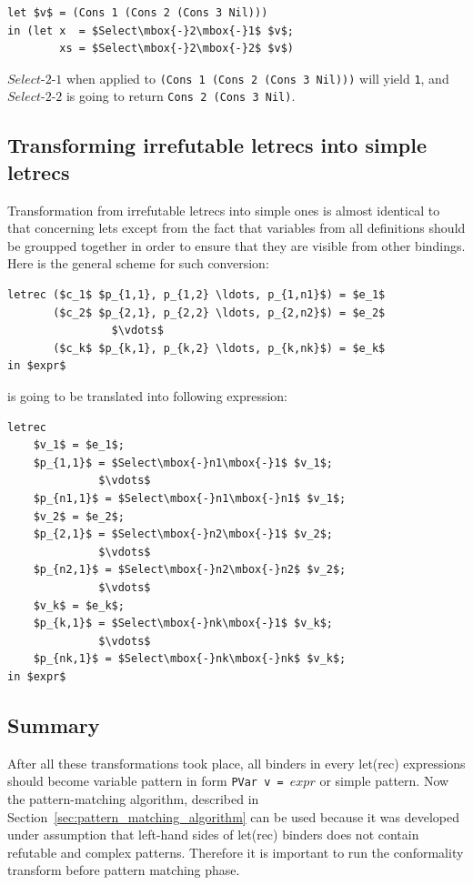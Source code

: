 \documentclass[12pt,a4paper]{report}
\begin{document}
\vspace*{0.2in}
\begin{lstlisting}[style=haskell,mathescape=true]
let $v$ = (Cons 1 (Cons 2 (Cons 3 Nil)))
in (let x  = $Select\mbox{-}2\mbox{-}1$ $v$;
        xs = $Select\mbox{-}2\mbox{-}2$ $v$)
\end{lstlisting}
$Select\mbox{-}2\mbox{-}1$ when applied to \texttt{(Cons 1 (Cons 2 (Cons 3
Nil)))} will yield \texttt{1}, and $Select\mbox{-}2\mbox{-}2$ is going to return
\texttt{Cons 2 (Cons 3 Nil)}.

\subsection{Transforming irrefutable letrecs into simple letrecs}
Transformation from irrefutable letrecs into simple ones is almost
identical to that concerning lets except from the fact that variables
from all definitions should be groupped together in order to ensure that
they are visible from other bindings. Here is the general scheme for such
conversion:

\vspace*{0.2in}
\begin{lstlisting}[style=haskell,mathescape=true]
letrec ($c_1$ $p_{1,1}, p_{1,2} \ldots, p_{1,n1}$) = $e_1$
       ($c_2$ $p_{2,1}, p_{2,2} \ldots, p_{2,n2}$) = $e_2$
                $\vdots$
       ($c_k$ $p_{k,1}, p_{k,2} \ldots, p_{k,nk}$) = $e_k$
in $expr$
\end{lstlisting}
is going to be translated into following expression:

\vspace*{0.2in}
\begin{lstlisting}[style=haskell,mathescape=true]
letrec
    $v_1$ = $e_1$;
    $p_{1,1}$ = $Select\mbox{-}n1\mbox{-}1$ $v_1$;
              $\vdots$
    $p_{n1,1}$ = $Select\mbox{-}n1\mbox{-}n1$ $v_1$;
    $v_2$ = $e_2$;
    $p_{2,1}$ = $Select\mbox{-}n2\mbox{-}1$ $v_2$;
              $\vdots$
    $p_{n2,1}$ = $Select\mbox{-}n2\mbox{-}n2$ $v_2$;
              $\vdots$
    $v_k$ = $e_k$;
    $p_{k,1}$ = $Select\mbox{-}nk\mbox{-}1$ $v_k$;
              $\vdots$
    $p_{nk,1}$ = $Select\mbox{-}nk\mbox{-}nk$ $v_k$;
in $expr$
\end{lstlisting}

\subsection{Summary}
After all these transformations took place, all binders in every
let(rec) expressions should become variable pattern in form
\texttt{PVar v = $expr$} or simple pattern. Now the pattern-matching algorithm,
described in Section~\ref{sec:pattern_matching_algorithm} can be used because
it was developed under assumption that left-hand sides of let(rec)
binders does not contain refutable and complex patterns. Therefore it is
important to run the conformality transform before pattern matching phase.
\end{document}
